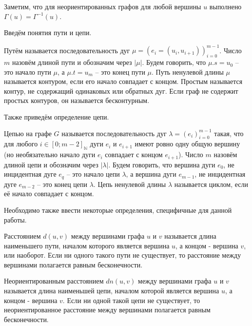 Заметим, что для неориентированных графов для любой вершины $u$ выполнено $\Gamma(u) = \Gamma^{-1}(u)$.

Введём понятия пути и цепи.

\begin{defn}
	Путём называется последовательность дуг $\mu = (e_i = (u_i, u_{i+1}))_{i = 0}^{m-1}$. Число $m$ назовём длиной пути и обозначим через $|\mu|$. Будем говорить, что $\mu.s = u_0$ -- это начало пути $\mu$, а $\mu.t = u_m$ -- это конец пути $\mu$. Путь ненулевой длины $\mu$ называется контуром, если его начало совпадает с концом. Простым называется контур, не содержащий одинаковых или обратных дуг. Если граф не содержит простых контуров, он называется бесконтурным.
\end{defn} 

Также приведём определение цепи.

\begin{defn}
	Цепью на графе $G$ называется последовательность дуг $\lambda = (e_i)_{i = 0}^{m-1}$ такая, что для любого $i \in [0;m-2]_\mathbb{N}$ дуги $e_i$ и $e_{i+1}$ имеют ровно одну общую вершину (но необязательно начало дуги $e_i$ совпадает с концом $e_{i+1}$). Число $m$ назовём длиной цепи и обозначим через $|\lambda|$. Будем говорить, что вершина дуги $e_0$, не инцидентная дуге $e_q$ -- это начало цепи $\lambda$, а вершина дуги $e_{m-1}$, не инцидентная дуге $e_{m-2}$ -- это конец цепи $\lambda$. Цепь ненулевой длины $\lambda$ называется циклом, если её начало совпадает с концом.
\end{defn} 

Необходимо также ввести некоторые определения, специфичные для данной работы.

\begin{defn}
	Расстоянием $d(u, v)$ между вершинами графа $u$ и $v$ называется длина наименьшего пути, началом которого является вершина $u$, а концом - вершина $v$, или наоборот. Если ни одного такого пути не существует, то расстояние между вершинами полагается равным бесконечности.
\end{defn}

\begin{defn}
	Неориентированным расстоянием $dn(u, v)$ между вершинами графа $u$ и $v$ называется длина наименьшей цепи, началом которой является вершина $u$, а концом - вершина $v$. Если ни одной такой цепи не существует, то неориентированное расстояние между вершинами полагается равным бесконечности.
\end{defn}

